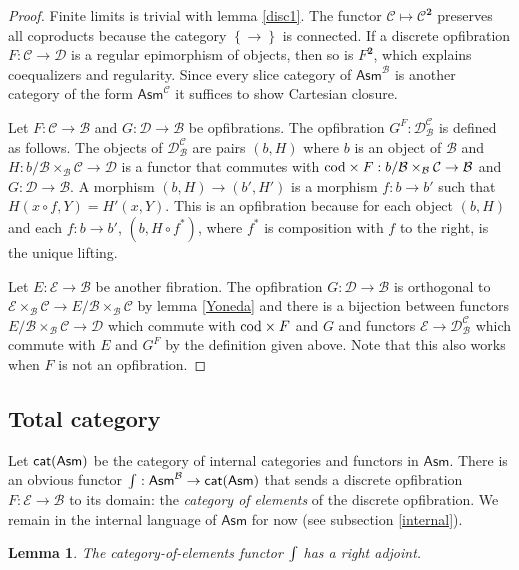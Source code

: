 \documentclass{amsart}
\theoremstyle{plain}
\newtheorem{lemma}[theorem]{Lemma}
\theoremstyle{definition}
\newcommand\cat\mathcal
\newcommand\set[1]{\left\{#1\right\}}
\newcommand\ri{^*}
\newcommand\Asm{\mathsf{Asm}}
\newcommand\sier{{\mathbf 2}}
\begin{document}
\begin{proof} Finite limits is trivial with lemma \ref{disc1}. The functor $\cat C \mapsto \cat C^\sier$ preserves all coproducts because the category $\set\to$ is connected. If a discrete opfibration $F:\cat C\to\cat D$ is a regular epimorphism of objects, then so is $F^\sier$, which explains coequalizers and regularity. Since every slice category of $\Asm^{\cat B}$ is another category of the form $\Asm^{\cat C}$ it suffices to show Cartesian closure. 

Let $F:\cat C\to\cat B$ and $G:\cat D\to\cat B$ be opfibrations. The opfibration $G^F:\cat D^{\cat C}_{\cat B}$ is defined as follows. The objects of $\cat D^{\cat C}_{\cat B}$ are pairs $(b,H)$ where $b$ is an object of $\cat B$ and $H:b/\cat B \times_{\cat B} \cat C\to \cat D$ is a functor that commutes with $\cod\times F:b/\cat B \times_{\cat B} \cat C \to \cat B$ and $G:\cat D \to \cat B$. A morphism $(b,H) \to (b', H')$ is a morphism $f:b\to b'$ such that $H(x\circ f,Y) = H'(x,Y)$. This is an opfibration because for each object $(b,H)$ and each $f:b\to b'$, $(b,H\circ f\ri)$, where $f\ri$ is composition with $f$ to the right, is the unique lifting.

Let $E:\cat E\to\cat B$ be another fibration. The opfibration $G:\cat D\to\cat B$ is orthogonal to $\cat E\times_{\cat B}\cat C \to E/\cat B\times_{\cat B} \cat C$ by lemma \ref{Yoneda} and there is a bijection between functors $E/\cat B\times_{\cat B} \cat C \to\cat D$ which commute with $\mathrm{cod}\times F$ and $G$ and functors $\cat E \to \cat D^{\cat C}_{\cat B}$ which commute with $E$ and $G^F$ by the definition given above. Note that this also works when $F$ is not an opfibration.
\end{proof}

\subsection{Total category}
Let $\mathsf{cat(Asm)}$ be the category of internal categories and functors in $\Asm$. There is an obvious functor $\tot:\Asm^{\cat B} \to \catasm$ that sends a discrete opfibration $F:\cat E\to\cat B$ to its domain: the \emph{category of elements} of the discrete opfibration. We remain in the internal language of $\Asm$ for now (see subsection \ref{internal}).

\begin{lemma} The category-of-elements functor $\mathord{\int}$ has a right adjoint. \end{lemma}
\end{document}
